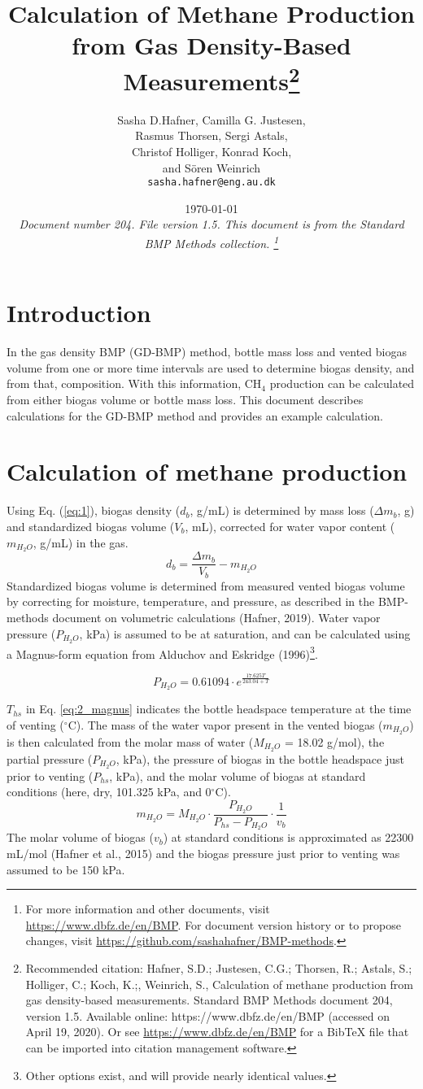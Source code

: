 \documentclass[]{article}
\title {Calculation of Methane Production from Gas Density-Based Measurements\footnote{
  Recommended citation: 
Hafner, S.D.; Justesen, C.G.; Thorsen, R.; Astals, S.; Holliger, C.; Koch, K.;, Weinrich, S., Calculation of methane production from gas density-based measurements. Standard BMP Methods document 204, version 1.5. Available online: https://www.dbfz.de/en/BMP (accessed on April 19, 2020).
\newline
  Or see \url{https://www.dbfz.de/en/BMP} for a BibTeX file that can be imported into citation management software.
}
}
\author{Sasha D.Hafner, Camilla G. Justesen, \\ Rasmus Thorsen, Sergi Astals, \\ Christof Holliger, Konrad Koch, \\ and S{\"o}ren Weinrich
\\
\texttt{sasha.hafner@eng.au.dk}\\
}
\date{\today \\
\bigskip
\textit{
  Document number 204.
  File version 1.5. 
  This document is from the Standard BMP Methods collection.
    \footnote{For more information and other documents, visit \url{https://www.dbfz.de/en/BMP}. 
    For document version history or to propose changes, visit \url{https://github.com/sashahafner/BMP-methods}.}
}
}
\begin{document}
\maketitle

\section{Introduction}
In the gas density BMP (GD-BMP) method, bottle mass loss and vented biogas volume from one or more time intervals are used to determine biogas density, and from that, composition. 
With this information, CH$_4$ production can be calculated from either biogas volume or bottle mass loss.
This document describes calculations for the GD-BMP method and provides an example calculation.

\section{Calculation of methane production}
Using Eq. (\ref{eq:1}), biogas density ($d_b$, g/mL) is determined by mass loss ($\Delta m_b$, g) and standardized biogas volume ($V_b$, mL), corrected for water vapor content ($m_{H_2O}$, g/mL) in the gas. 
\begin{equation}
  \label{eq:1}
  d_b=\frac{\Delta m_b}{V_b}-m_{H_2O}
\end{equation}
Standardized biogas volume is determined from measured vented biogas volume by correcting for moisture, temperature, and pressure, as described in the BMP-methods document on volumetric calculations (Hafner, 2019).
Water vapor pressure ($P_{H_2O}$, kPa) is assumed to be at saturation, and can be calculated using a Magnus-form equation from Alduchov and Eskridge (1996)\footnote{
  Other options exist, and will provide nearly identical values.
}.

\begin{equation}
\label{eq:2_magnus}
   P_{H_2O} = 0.61094 \cdot e^{\frac{17.625 T}{243.04 + T}}
\end{equation}

$T_{hs}$ in Eq. \ref{eq:2_magnus} indicates the bottle headspace temperature at the time of venting ($^\circ$C). 
The mass of the water vapor present in the vented biogas ($m_{H_2O}$) is then calculated from the molar mass of water ($M_{H_2O}$ = 18.02 g/mol), the partial pressure ($P_{H_2O}$, kPa), the pressure of biogas in the bottle headspace just prior to venting ($P_{hs}$, kPa), and the molar volume of biogas at standard conditions (here, dry, 101.325 kPa, and 0$^\circ$C).
\begin{equation}
  \label{eq:3}
  m_{H_2O}=M_{H_2O} \cdot \frac{P_{H_2O}}{P_{hs}-P_{H_2O}} \cdot \frac{1}{v_b}
\end{equation}
The molar volume of biogas ($v_b$) at standard conditions is approximated as 22300 mL/mol (Hafner et al., 2015) and the biogas pressure just prior to venting was assumed to be 150 kPa.
\end{document}
